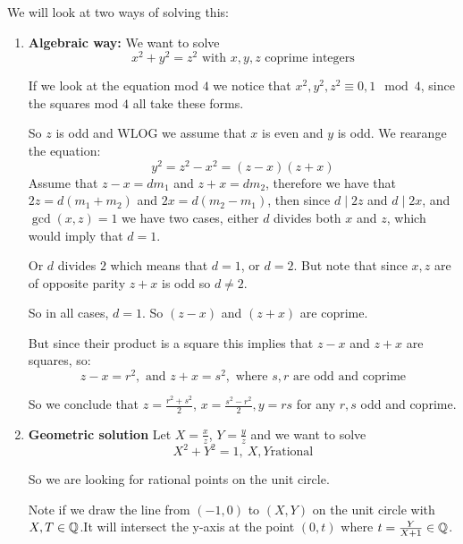 We will look at two ways of solving this:\begin{enumerate}
    \item \textbf{Algebraic way:} 
    We want to solve\begin{equation}
        x^2+y^2 = z^2 \text{ with }x,y,z\text{ coprime integers}
    \end{equation}
    
    If we look at the equation mod $4$ we notice that $x^2,y^2,z^2 \equiv 0,1 \mod 4$, since the squares mod $4$ all take these forms.
    
    So $z$ is odd and WLOG we assume that $x$ is even and $y$ is odd. 
    We rearange the equation:\begin{equation}
        y^2 = z^2-x^2 = (z-x)(z+x)
    \end{equation}
    Assume that $z-x = dm_1$ and $z+x = dm_2$, therefore we have that $2z = d(m_1+m_2)$ and $2x = d(m_2-m_1)$, then since $d\mid 2z$ and $d\mid 2x$, and $\gcd(x,z) = 1$ we have two cases, either $d$ divides both $x$ and $z$, which would imply that $d=1$.
    
    Or $d$ divides $2$ which means that $d = 1$, or $d=2$. But note that since $x,z$ are of opposite parity $z+x$ is odd so $d\neq 2$.
    
    So in all cases, $d = 1$. So $(z-x)$ and $(z+x)$ are coprime.
    
    But since their product is a square this implies that $z-x$ and $z+x$ are squares, so:\begin{equation}
        z-x = r^2, \text{ and }z+x = s^2, \text{ where }s,r\text{ are odd and coprime}
    \end{equation}
    
    So we conclude that $z = \frac{r^2+s^2}{2}$, $x = \frac{s^2-r^2}{2}, y=rs $ for any $r,s$ odd and coprime.
    
    \item \textbf{Geometric solution}
    Let $X = \frac{x}{z}$, $Y = \frac{y}{z}$ and we want to solve\begin{equation}
        X^2+Y^2=1, \ X,Y\text{rational}
    \end{equation}
    
    So we are looking for rational points on the unit circle.
    
    Note if we draw the line from $(-1,0)$ to $(X,Y)$ on the unit circle with $X,T\in \mathbb{Q}$.It will intersect the y-axis at the point $(0,t)$ where $t=\frac{Y}{X+1}\in \mathbb{Q}$.
    

\end{enumerate}

